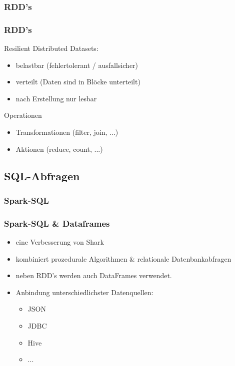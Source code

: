 \documentclass[hyperref={pdfpagelabels=false}]{beamer}
\begin{document}
\subsubsection{RDD’s}
\begin{frame} [t]
\frametitle{RDD’s}

Resilient Distributed Datasets:
\begin{itemize}
	\item belastbar (fehlertolerant / ausfallsicher)
	\item verteilt (Daten sind in Blöcke unterteilt)
	\item nach Erstellung nur lesbar	
\end{itemize}

\vspace{0.4cm}

Operationen
\begin{itemize}
	\item Transformationen (filter, join, ...)
	\item Aktionen (reduce, count, ...)
\end{itemize}

\end{frame}


\subsection{SQL-Abfragen}
\subsubsection{Spark-SQL}
\begin{frame} [t]
\frametitle{Spark-SQL \& Dataframes}
\begin{itemize}
	\item eine Verbesserung von Shark
	\item kombiniert prozedurale Algorithmen \& relationale Datenbankabfragen
	\item neben RDD's werden auch DataFrames verwendet.	
	\item Anbindung unterschiedlichster Datenquellen:
		
		
		\begin{itemize}
			\item JSON
			\item JDBC
			\item Hive
			\item ...
		\end{itemize}
		
\end{itemize}



\end{frame}
\end{document}
